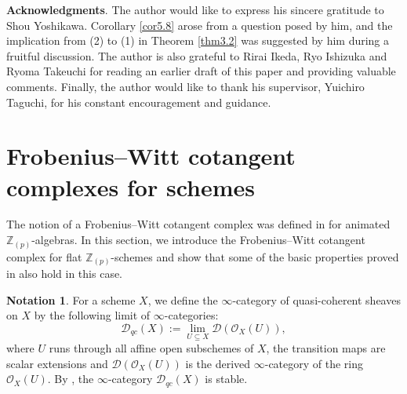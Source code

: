\documentclass[11pt, a4paper]{amsart}
\theoremstyle{plain}
\theoremstyle{definition}
\newtheorem{notation}[theorem]{Notation}
\begin{document}
\vspace{2mm}
\textbf{Acknowledgments}. The author would like to express his sincere gratitude to Shou Yoshikawa. Corollary \ref{cor5.8} arose from a question posed by him, and the implication from (2) to (1) in Theorem \ref{thm3.2} was suggested by him during a fruitful discussion. The author is also grateful to Rirai Ikeda, Ryo Ishizuka and Ryoma Takeuchi for reading an earlier draft of this paper and providing valuable comments. Finally, the author would like to thank his supervisor, Yuichiro Taguchi, for his constant encouragement and guidance.

\section{Frobenius--Witt cotangent complexes for schemes}
The notion of a Frobenius--Witt cotangent complex was defined in \cite{Shi26} for animated $\mathbb Z_{(p)}$-algebras. In this section, we introduce the Frobenius–Witt cotangent complex for flat $\mathbb Z_{(p)}$-schemes and show that some of the basic properties proved in \cite{Shi26} also hold in this case. 

\begin{notation}
    For a scheme $X$, we define the $\infty$-category of quasi-coherent sheaves on $X$ by the following limit of $\infty$-categories: \[\mathcal D_{qc}(X):=\operatorname{lim}_{U\subseteq X}\mathcal D(\mathcal O_X(U)),\] where $U$ runs through all affine open subschemes of $X$, the transition maps are scalar extensions and $\mathcal D(\mathcal O_X(U))$ is the derived $\infty$-category of the ring $\mathcal O_X(U)$. By \cite[Theorem 1.1.4.4]{Lur17}, the $\infty$-category $\mathcal D_{qc}(X)$ is stable.
\end{notation}
\end{document}
